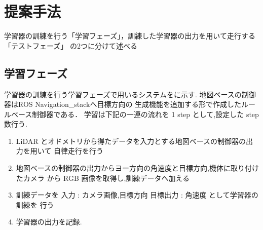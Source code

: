 \documentclass[10pt]{jarticle}
\begin{document}
    
    
    
    
    \section{提案手法}%
    学習器の訓練を行う「学習フェーズ」，訓練した学習器の出力を用いて走行する「テストフェーズ」
    の2つに分けて述べる
    \subsection{学習フェーズ}
    学習器の訓練を行う学習フェーズで用いるシステムをに示す.
    地図ベースの制御器はROS Navigation\_stackへ目標方向の
    生成機能を追加する形で作成したルールベース制御器である．
    学習は下記の一連の流れを 1 step として,設定した step 数行う.
    \begin{enumerate}
        \setlength{\parskip}{0cm} %
        \setlength{\itemsep}{0cm} %
        \item LiDAR とオドメトリから得たデータを入力とする地図ベースの制御器の出力を用いて
                自律走行を行う
        \item 地図ベースの制御器の出力からヨー方向の角速度と目標方向,機体に取り付けたカメラ
        から RGB 画像を取得し,訓練データへ加える
        \item 訓練データを 入力 : カメラ画像,目標方向 目標出力 : 角速度 として学習器の訓練を
        行う
        \item 学習器の出力を記録.
    \end{enumerate}
\end{document}
